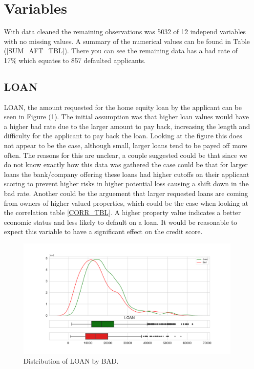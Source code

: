 \section{Variables}

With data cleaned the remaining observations was 5032 of 12 independ variables with no missing values. A summary of the numerical values can be found in Table (\ref{SUM_AFT_TBL}). There you can see the remaining data has a bad rate of 17\% which equates to 857 defaulted applicants.

\subsection*{LOAN}

LOAN,  the amount requested for the home equity loan by the applicant can be seen in Figure (\ref{loan_dist}). The initial assumption was that higher loan values would have a higher bad rate due to the larger amount to pay back,  increasing the length and difficulty for the applicant to pay back the loan. Looking at the figure this does not appear to be the case,  although small,  larger loans tend to be payed off more often. The reasons for this are unclear,  a couple suggested could be that since we do not know exactly how this data was gathered the case could be that for larger loans the bank/company offering these loans had higher cutoffs on their applicant scoring to prevent higher risks in higher potential loss causing a shift down in the bad rate. Another could be the arguement that larger requested loans are coming from owners of higher valued properties,  which could be the case when looking at the correlation table \ref{CORR_TBL}. A higher property value indicates a better economic status and less likely to default on a loan. It would be reasonable to expect this variable to have a significant effect on the credit score.

\begin{figure}[!ht]
	\centering
	\includegraphics[scale=0.40]{figs/loan_dist.pdf}
	\caption{Distribution of LOAN by BAD. \label{loan_dist}}
\end{figure}

